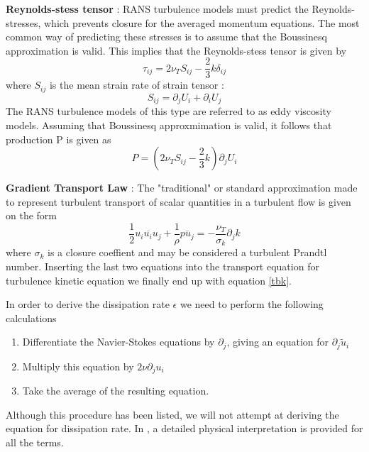 \documentclass[11pt]{article}
\begin{document}
{\textbf{Reynolds-stess tensor} : RANS turbulence models must predict the Reynolds-stresses, 
which prevents closure for the averaged momentum equations. The most common way of 
predicting these stresses is to assume that the Boussinesq approximation is valid. This implies 
that the Reynolds-stess tensor is given by
\begin{equation*}
\tau_{ij} = 2\nu_T S_{ij} -\frac{2}{3} k \delta_{ij}
\end{equation*}
where $S_{ij}$ is the mean strain rate of strain tensor :
\begin{equation*}
S_{ij} = \partial_j U_i + \partial_i U_j
\end{equation*}
The RANS turbulence models of this type are referred to as eddy viscosity models. 
Assuming that Boussinesq approxmimation is valid, it follows that production P is given as
\begin{equation} \label{eq:production}
P = \left(2\nu_T S_{ij} -\frac{2}{3} k \right) \partial_j U_i
\end{equation}

\textbf{Gradient Transport Law} : The "traditional" or standard approximation made 
to represent turbulent transport of scalar quantities in a turbulent flow is given on the form 
\begin{equation*}
\frac{1}{2}\overline{u_i u_i u_j} + \frac{1}{\rho}\overline{p u_j} = -\frac{\nu_T}{\sigma_k} \partial_j k
\end{equation*}
where $\sigma_k$ is a closure coeffient and may be considered a turbulent Prandtl number.
Inserting the last two equations into the transport equation for turbulence kinetic equation 
we finally end up with equation \eqref{tbk}.

In order to derive the dissipation rate $\epsilon$ we need to perform the following calculations
\begin{enumerate}
\item Differentiate the Navier-Stokes equations by $\partial_j$, giving an equation for $\partial_j \tilde{u}_i$
\item Multiply this equation by $2\nu \partial_j u_i$
\item Take the average of the resulting equation.
\end{enumerate}
Although this procedure has been listed, we will not attempt at deriving the equation for 
dissipation rate. In \cite[page 28-29]{14}, a detailed physical interpretation is provided
for all the terms.


\newpage
\begin{thebibliography}{9}


\end{thebibliography}}
\end{document}
